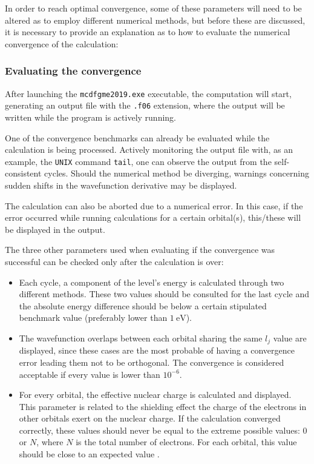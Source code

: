 In order to reach optimal convergence, some of these parameters will need to be altered as to employ different numerical methods, but before these are discussed, it is necessary to provide an explanation as to how to evaluate the numerical convergence of the calculation:



\subsubsection{Evaluating the convergence}
After launching the \verb|mcdfgme2019.exe| executable, the computation will start, generating an output file with the \verb|.f06| extension, where the output will be written while the program is actively running.

One of the convergence benchmarks can already be evaluated while the calculation is being processed. Actively monitoring the output file with, as an example, the \verb|UNIX| command \verb|tail|, one can observe the output from the self-consistent cycles. Should the numerical method be diverging, warnings concerning sudden shifts in the wavefunction derivative may be displayed.

The calculation can also be aborted due to a numerical error. In this case, if the error occurred while running calculations for a certain orbital(s), this/these will be displayed in the output. 

The three other parameters used when evaluating if the convergence was successful can be checked only after the calculation is over:

\begin{itemize}
    \item Each cycle, a component of the level's energy is calculated through two different methods. These two values should be consulted for the last cycle and the absolute energy difference should be below a certain stipulated benchmark value (preferably lower than $1\ \si{\electronvolt}$).
    \item The wavefunction overlaps between each orbital sharing the same $l_j$ value are displayed, since these cases are the most probable of having a convergence error leading them not to be orthogonal. The convergence is considered acceptable if every value is lower than $10^{-6}$.
    \item For every orbital, the effective nuclear charge is calculated and displayed. This parameter is related to the shielding effect the charge of the electrons in other orbitals exert on the nuclear charge. If the calculation converged correctly, these values should never be equal to the extreme possible values: $0$ or $N$, where $N$ is the total number of electrons. For each orbital, this value should be close to an expected value .
\end{itemize}





